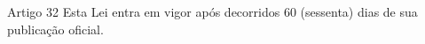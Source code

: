 \begin{frame}{Artigo 32}
Esta Lei entra em vigor após decorridos 60 (sessenta) dias de sua publicação oficial.
\end{frame}